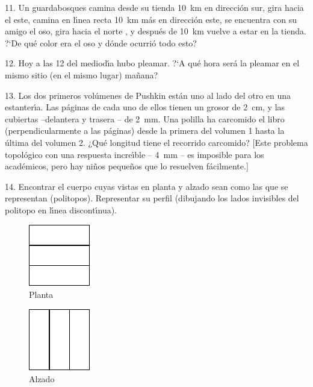 \begin{problem}{11.}
	Un guardabosques camina desde su tienda \SI{10}{\km} en direcci\'on sur, gira hacia el este, camina en l\'{\i}nea recta
	\SI{10}{\km} m\'as en direcci\'on este, se encuentra con su amigo el oso, gira hacia el norte , y despu\'es de \SI{10}{\km} vuelve a
	estar en la tienda. ?`De qu\'e color era el oso y d\'onde ocurri\'o todo esto?
\end{problem}

\begin{problem}{12.}
	Hoy a las 12 del mediod\'{\i}a hubo pleamar. ?`A qu\'e hora ser\'a la pleamar en el mismo sitio (en el mismo lugar)
	ma\~nana?
\end{problem}

\begin{problem}{13.}
	Los dos primeros vol\'umenes de Pushkin est\'an uno al lado del otro en una estanter\'{\i}a. 
	Las p\'aginas de cada uno de ellos tienen un grosor de \SI{2}{\cm}, y las cubiertas --delantera y trasera 
	-- de \SI{2}{\mm}. Una polilla ha carcomido el libro (perpendicularmente a las p\'aginas) desde la primera del volumen 1 hasta
	la \'ultima del volumen 2. ¿Qu\'e longitud tiene el recorrido carcomido?
	[Este problema topol\'ogico con una respuesta incre\'{\i}ble -- \SI{4}{\mm} -- es imposible para los acad\'emicos,
	pero hay ni\~nos peque\~nos que lo resuelven f\'acilmente.]  
\end{problem}

\begin{problem}{14.}
	Encontrar el cuerpo cuyas vistas en planta y alzado sean como las que se representan (politopos).
	Representar su perfil (dibujando los lados invisibles del politopo en l\'{\i}nea discont\'{\i}nua).
	\begin{figure}
		\footnotesize
		\null\hfill
		\parbox{0.2\linewidth}{\centering\includegraphics{resources/taskbook-99}\\Planta}
		\hfill
		\parbox{0.2\linewidth}{\centering\includegraphics{resources/taskbook-98}\\Alzado}
		\hfill\null
	\end{figure}
\end{problem}


